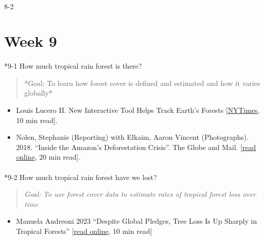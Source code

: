 \documentclass[
  10pt,
  letterpaper,
  oneside,
  open=any]{scrbook}
\makeatletter
\let\oldparagraph\paragraph
\renewcommand{\paragraph}{
    \@ifstar
      \xxxParagraphStar
      \xxxParagraphNoStar
  }
\newcommand{\xxxParagraphStar}[1]{\oldparagraph*{#1}\mbox{}}
\newcommand{\xxxParagraphNoStar}[1]{\oldparagraph{#1}\mbox{}}
\providecommand{\tightlist}{%
  \setlength{\itemsep}{0pt}\setlength{\parskip}{0pt}}
\makeatother
\begin{document}
\paragraph{8-2}\label{section-1}

\section*{Week 9}\label{week-9}


\paragraph*{9-1 How much tropical rain forest is
there?}\label{how-much-tropical-rain-forest-is-there}

\begin{quote}
*Goal: To learn how forest cover is defined and estimated and how it
varies globally*
\end{quote}

\begin{itemize}
\item
  Louis Lucero II. New Interactive Tool Helps Track Earth's Forests
  {[}\href{https://www.nytimes.com/2013/11/15/science/earth/new-interactive-tool-helps-track-earths-forests.html}{NYTimes},
  10 min read{]}.
\item
  Nolen, Stephanie (Reporting) with Elkaim, Aaron Vincent (Photographs).
  2018. ``Inside the Amazon's Deforestation Crisis''. The Globe and
  Mail.
  {[}\href{https://www.theglobeandmail.com/news/world/amazon-rainforest-deforestation-crisis/article37722932/}{read
  online}, 20 min read{]}.
\end{itemize}

\paragraph*{9-2 How much tropical rain forest have we
lost?}\label{how-much-tropical-rain-forest-have-we-lost}

\begin{quote}
\emph{Goal: To use forest cover data to estimate rates of tropical
forest loss over time}
\end{quote}

\begin{itemize}
\tightlist
\item
  Manuela Andreoni 2023 ``Despite Global Pledges, Tree Loss Is Up
  Sharply in Tropical Forests''
  {[}\href{https://www.nytimes.com/2023/06/27/climate/trees-tropical-forests-deforestation.html}{read
  online}, 10 min read{]}
\end{itemize}
\end{document}
